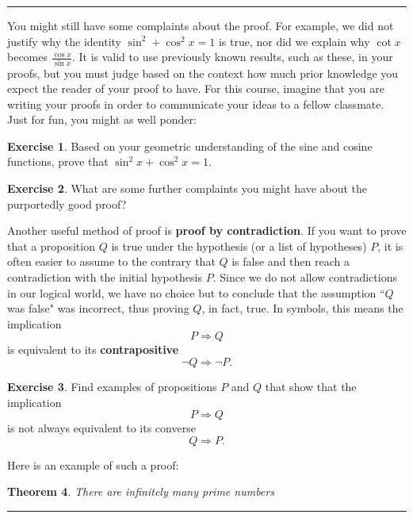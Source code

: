 \documentclass[12pt]{article}
\newtheorem{theorem}{\color{navy}Theorem}[section]
\theoremstyle{definition}
\newtheorem{exercise}[theorem]{\color{orange}Exercise}
\numberwithin{equation}{subsection}
\begin{document}
\hrule

\newpage

You might still have some complaints about the proof.  For example, we did not justify why the identity $\sin^2 + \cos^2 x = 1$ is true, nor did we explain why $\cot x$ becomes $\frac{\cos x}{\sin x}$. It is valid to use previously known results, such as these, in your proofs, but you must judge based on the context how much prior knowledge you expect the reader of your proof to have.  For this course, imagine that you are writing your proofs in order to communicate your ideas to a fellow classmate.  Just for fun, you might as well ponder:


\begin{exercise}
Based on your geometric understanding of the sine and cosine functions, prove that $\sin^2 x + \cos^2 x = 1$.
\end{exercise} 
 
\begin{exercise}
What are some further complaints you might have about the purportedly good proof?
\end{exercise}

\bigskip

Another useful method of proof is \textbf{proof by contradiction}.  If you want to prove that a proposition $Q$ is true under the hypothesis (or a list of hypotheses) $P$, it is often easier to assume to the contrary that $Q$ is false and then reach a contradiction with the initial hypothesis $P$.  Since we do not allow contradictions in our logical world, we have no choice but to conclude that the assumption ``$Q$ was false" was incorrect, thus proving $Q$, in fact, true.  In symbols, this means the implication 
\[
P \Longrightarrow Q
\]
is equivalent to its \textbf{contrapositive}
\[
 \neg Q \Longrightarrow \neg P.
\]  

\begin{exercise}  Find examples of propositions $P$ and $Q$ that show that the implication 
\[
P \Longrightarrow Q
\]
 is not always equivalent to its converse 
 \[
 Q \Longrightarrow P.
 \]
\end{exercise}

Here is an example of such a proof:

\begin{theorem}
There are infinitely many prime numbers
\end{theorem}

\hrule
\end{document}
